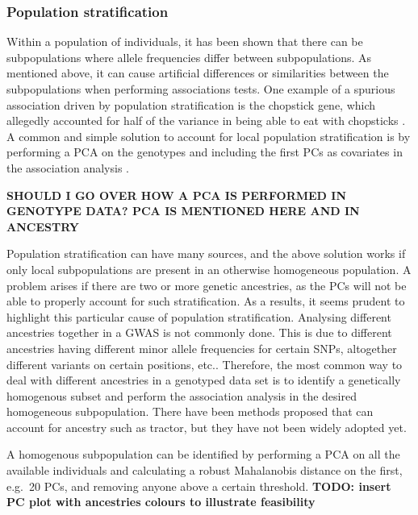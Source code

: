 \subsubsection{Population stratification}
Within a population of individuals, it has been shown that there can be subpopulations where allele frequencies differ between subpopulations\cite{abdellaoui2013association,genome2014whole}. As mentioned above, it can cause artificial differences or similarities between the subpopulations when performing associations tests. One example of a spurious association driven by population stratification is the chopstick gene, which allegedly accounted for half of the variance in being able to eat with chopsticks \cite{marees2018tutorial,hamer2000beware}. A common and simple solution to account for local population stratification is by performing a PCA on the genotypes and including the first PCs as covariates in the association analysis \cite{price2006principal,price2010new,prive2020efficient}.

\textbf{SHOULD I GO OVER HOW A PCA IS PERFORMED IN GENOTYPE DATA? PCA IS MENTIONED HERE AND IN ANCESTRY}

Population stratification can have many sources, and the above solution works if only local subpopulations are present in an otherwise homogeneous population. A problem arises if there are two or more genetic ancestries, as the PCs will not be able to properly account for such stratification. As a results, it seems prudent to highlight this particular cause of population stratification. Analysing different ancestries together in a GWAS is not commonly done. This is due to different ancestries having different minor allele frequencies for certain SNPs, altogether different variants on certain positions, etc.\cite{helgason2005icelandic}. Therefore, the most common way to deal with different ancestries in a genotyped data set is to identify a genetically homogenous subset and perform the association analysis in the desired homogeneous subpopulation. There have been methods proposed that can account for ancestry such as tractor\cite{atkinson2021tractor}, but they have not been widely adopted yet. 

A homogenous subpopulation can be identified by performing a PCA on all the available individuals and calculating a robust Mahalanobis distance on the first, e.g.\ 20 PCs, and removing anyone above a certain threshold\cite{prive2020efficient}. 
\textbf{TODO: insert PC plot with ancestries colours to illustrate feasibility}

